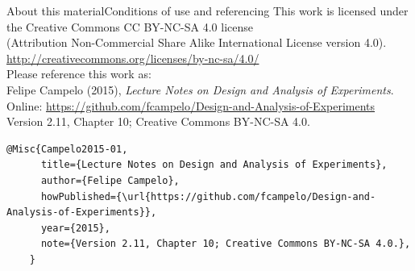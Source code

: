 \documentclass[t]{beamer}
\begin{document}
\begin{ftstf}{About this material}{Conditions of use and referencing}
\centering\footnotesize This work is licensed under the Creative Commons CC BY-NC-SA 4.0 license\\(Attribution Non-Commercial Share Alike International License version 4.0).\\
\vhalf
\url{http://creativecommons.org/licenses/by-nc-sa/4.0/}\\
\vone
\footnotesize Please reference this work as:\\
\footnotesize \flushleft Felipe Campelo (2015), \textit{Lecture Notes on Design and Analysis of Experiments}.\\Online: {\scriptsize\url{https://github.com/fcampelo/Design-and-Analysis-of-Experiments}}\\
Version 2.11, Chapter 10; Creative Commons BY-NC-SA 4.0.\\

\begin{Verbatim}[fontsize=\tiny]
    @Misc{Campelo2015-01,
      title={Lecture Notes on Design and Analysis of Experiments},
      author={Felipe Campelo},
      howPublished={\url{https://github.com/fcampelo/Design-and-Analysis-of-Experiments}},
      year={2015},
      note={Version 2.11, Chapter 10; Creative Commons BY-NC-SA 4.0.},
    }
\end{Verbatim}

\end{ftstf}
\end{document}
